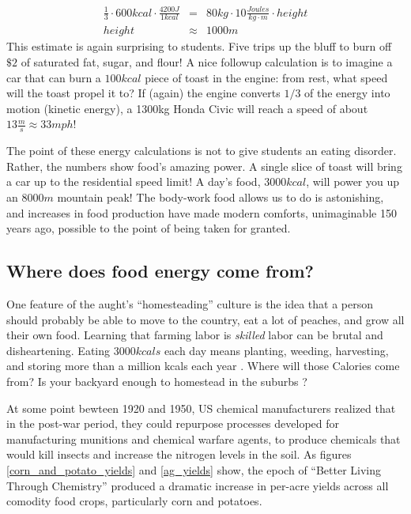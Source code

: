 \documentclass[12pt]{iopart}
\newcommand{\bea}{\begin{eqnarray}}
\newcommand{\eea}{\end{eqnarray}}
\begin{document}
\bea
\frac{1}{3}\cdot600kcal\cdot\frac{4200J}{1kcal} 
	&=& 80kg\cdot10\frac{Joules}{kg\cdot m}\cdot height \label{eq:bar_chart}\\
height &\approx&  1000 m
\eea
This estimate is again surprising to students.  Five trips up the bluff to burn off $\$2$ of saturated fat, sugar, and flour!  A nice followup calculation is to imagine a car that can burn a $100kcal$ piece of toast in the engine: from rest, what speed will the toast propel it to? If (again) the engine converts $1/3$ of the energy into motion (kinetic energy), a 1300kg Honda Civic will reach a speed of about $13\frac{m}{s}\approx33mph$!  

The point of these energy calculations is not to give students an eating disorder.  Rather, the numbers show food's amazing power. A single slice of toast will bring a car up to the residential speed limit!  A day's food, $3000kcal$, will power you up an $8000m$ mountain peak! The body-work food allows us to do is astonishing, and increases in food production have made modern  comforts, unimaginable 150 years ago, possible to the point of being taken for granted.  

\subsection{Where does food energy come from?}
One feature of the aught's ``homesteading'' culture \cite{homesteading} is the idea that a person should probably be able to move to the country, eat a lot of peaches, and grow all their own food.  Learning that farming labor is \textit{skilled} labor can be brutal and disheartening. Eating $3000kcals$ each day means planting, weeding, harvesting, and storing more than a million kcals each year \cite{Haspel}.  Where will those Calories come from? Is your backyard enough to homestead in the suburbs \cite{backyard_homestead}?

At some point bewteen 1920 and 1950, US chemical manufacturers realized that in the post-war period, they could repurpose processes developed for manufacturing munitions and chemical warfare agents, to produce chemicals that would kill insects and increase the nitrogen levels in the soil. 
As figures \ref{corn_and_potato_yields} and \ref{ag_yields} show, the epoch of ``Better Living Through Chemistry'' produced a dramatic increase in per-acre yields across all comodity food crops, particularly corn and potatoes.  
\end{document}

